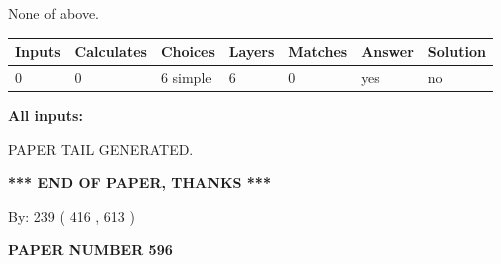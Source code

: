 \documentclass{ctexart}
\begin{document}
 
 None of above.
 
 
\noindent{}
 
 
   
   
   
   
\noindent\begin{tabular}{|l|l|l|l|l|l|l|}
 \hline
Inputs & Calculates & Choices & Layers & Matches & Answer & Solution \\ \hline
 0  & 
 0  & 
 6
  simple  
  & 
 6  & 
 0  & 
  yes & 
  no 
  \\ \hline
 \end{tabular}
   
   
   
   
\noindent{}
   
   
   
   
\noindent\vspace{0.1in}\hspace{-0.08in} {\textbf{\Large{All inputs: }}}
   
   
   
   
   
   
 \vspace{0.2in}
 
   
   
\vspace{2.0in} PAPER TAIL GENERATED.
   
   
   
   
\vspace{1.0in} 
{\textbf{\large{ *** END OF PAPER, THANKS *** }}} 
   
   
\hspace{1.0in} By: 
 239 ( 416 ,  613 )
   
   
   
   
\newpage 
\setcounter{page}{ 
   596001 } 
   
   
   
   
 {\textbf{ \Large{ PAPER NUMBER  596  }}}
   
   
\vspace{0.2in}
   
   
   
   
   
   
   
\end{document}
